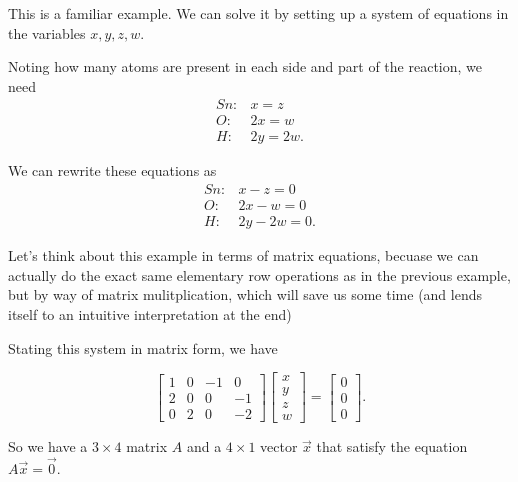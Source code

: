\documentclass{ximera}
\begin{document}
\begin{example}

This is a familiar example. We can solve it by setting up a system of
equations in the variables $x,y,z,w$. 

Noting how many atoms are present in each side and part of the reaction, we need
\begin{equation*}
  \begin{array}{cl}
    Sn: & x=z \\
    O: & 2x=w \\
    H: & 2y=2w.
  \end{array}
\end{equation*}

We can rewrite these equations as
\begin{equation*}
  \begin{array}{cl}
    Sn: & x - z = 0 \\
    O: & 2x - w = 0 \\
    H: & 2y - 2w = 0.
  \end{array}
\end{equation*}

Let's think about this example in terms of matrix equations, becuase we can actually do the exact same elementary row operations as in the previous example, but by way of matrix mulitplication, which will save us some time (and lends itself to an intuitive interpretation at the end)

Stating this system in matrix form, we have

\begin{equation*}
  \begin{bmatrix}
    1 & 0 & -1 & 0 \\
    2 & 0 & 0 & -1 \\
    0 & 2 & 0 & -2
  \end{bmatrix}
  \begin{bmatrix}
    x \\
    y \\
    z \\
    w
  \end{bmatrix}
  =
  \begin{bmatrix}
    0 \\
    0 \\
    0
  \end{bmatrix}.
\end{equation*}

So we have a $3\times 4$ matrix $A$ and a $4\times 1$ vector $\vec{x}$ that satisfy the equation $A\vec{x} = \vec{0}$.

\end{example}
\end{document}
